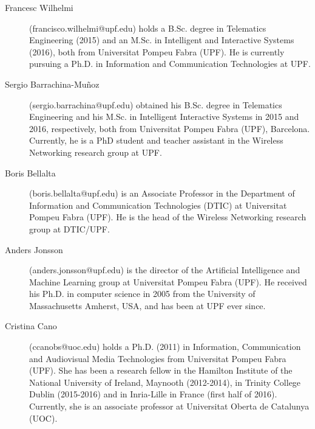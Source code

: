 \documentclass[twocolumn]{article}
\begin{document}
\begin{description}
	\item[Francesc Wilhelmi] (francisco.wilhelmi@upf.edu) holds a B.Sc. degree in Telematics Engineering (2015) and an M.Sc. in Intelligent and Interactive Systems (2016), both from Universitat Pompeu Fabra (UPF). He is currently pursuing a Ph.D. in Information and Communication Technologies at UPF.
	\item[Sergio Barrachina-Mu\~noz] (sergio.barrachina@upf.edu) obtained his B.Sc. degree in Telematics Engineering and his M.Sc. in Intelligent Interactive Systems in 2015 and 2016, respectively, both from Universitat Pompeu Fabra (UPF), Barcelona. Currently, he is a PhD student and teacher assistant in the Wireless Networking research group at UPF.%
	\item[Boris Bellalta] (boris.bellalta@upf.edu) is an Associate Professor in the Department of Information and Communication Technologies (DTIC) at Universitat Pompeu Fabra (UPF). He is the head of the Wireless Networking research group at DTIC/UPF.%
	\item[Anders Jonsson] (anders.jonsson@upf.edu) is the director of the Artificial Intelligence and Machine Learning group at Universitat Pompeu Fabra (UPF). He received his Ph.D. in computer science in 2005 from the University of Massachusetts Amherst, USA, and has been at UPF ever since. %
	\item[Cristina Cano] (ccanobs@uoc.edu) holds a Ph.D. (2011) in Information, Communication and Audiovisual Media Technologies from Universitat Pompeu Fabra (UPF). She has been a research fellow in the Hamilton Institute of the National University of Ireland, Maynooth (2012-2014), in Trinity College Dublin (2015-2016) and in Inria-Lille in France (first half of 2016). Currently, she is an associate professor at Universitat Oberta de Catalunya (UOC). %

\end{description}
\end{document}
